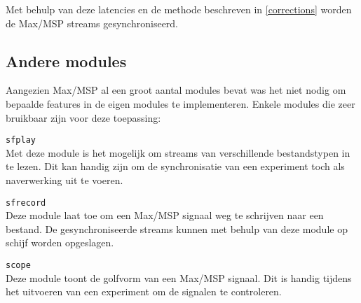 Met behulp van deze latencies en de methode beschreven in \ref{corrections} worden de Max/MSP streams gesynchroniseerd.

\subsection{Andere modules}

Aangezien Max/MSP al een groot aantal modules bevat was het niet nodig om bepaalde features in de eigen modules te implementeren. Enkele modules die zeer bruikbaar zijn voor deze toepassing:

\begin{description}
	\item\texttt{sfplay\textapprox} \hfill \\
	Met deze module is het mogelijk om streams van verschillende bestandstypen in te lezen. Dit kan handig zijn om de synchronisatie van een experiment toch als naverwerking uit te voeren.
	
	\item\texttt{sfrecord\textapprox} \hfill \\
	Deze module laat toe om een Max/MSP signaal weg te schrijven naar een bestand. De gesynchroniseerde streams kunnen met behulp van deze module op schijf worden opgeslagen.
	
	\item\texttt{scope\textapprox} \hfill \\
	Deze module toont de golfvorm van een Max/MSP signaal. Dit is handig tijdens het uitvoeren van een experiment om de signalen te controleren.
	
\end{description}


